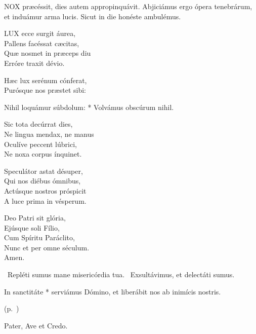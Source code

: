 


\lettrine[lines=2]{N}{OX} præcéssit, dies autem appropinquávit. Abjiciámus ergo ópera tenebrárum, et induámur arma lucis. Sicut in die honéste ambulémus.


\lettrine[lines=2]{L}{UX} ecce surgit áurea,\\
Pallens facéssat cæcitas,\\
Quæ nosmet in præceps diu\\
Erróre traxit dévio.

Hæc lux serénum cónferat,\\
Purósque nos præstet sibi:

Nihil loquámur súbdolum: * Volvámus obscúrum nihil.

Sic tota decúrrat dies,\\
Ne lingua mendax, ne manus\\
Oculíve peccent lúbrici,\\
Ne noxa corpus ínquinet.

Speculátor astat désuper,\\
Qui nos diébus ómnibus,\\
Actúsque nostros próspicit\\
A luce prima in vésperum.

Deo Patri sit glória,\\
Ejúsque soli Fílio,\\
Cum Spíritu Paráclito,\\
Nunc et per omne séculum.\\
Amen.

\V\ Repléti sumus mane misericórdia tua. \R\ Exsultávimus, et delectáti sumus.


 In sanctitáte * serviámus Dómino, et liberábit nos ab inimícis nostris.

 (p.~\pageref{feria5:precesferiales})


\sectionornament


Pater, Ave et Credo.

